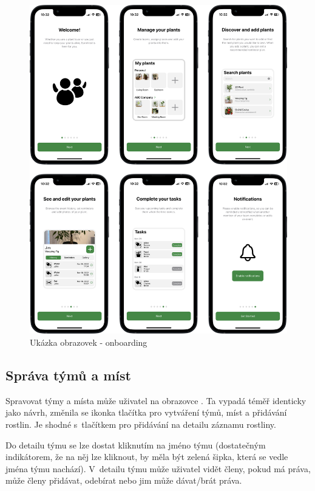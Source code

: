 \documentclass[thesis=M,czech]{FITthesis}[2019/12/23]
\begin{document}
\begin{figure}
	\centering
	\includegraphics[width=1\linewidth]{images/screenshots-1.png}
  	\caption{Ukázka obrazovek - onboarding}
  	\label{img:screenshots-1}
\end{figure}

\subsection{Správa týmů a míst}
Spravovat týmy a místa může uživatel na obrazovce . Ta vypadá téměř identicky jako návrh, změnila se ikonka tlačítka pro vytváření týmů, míst a přidávání rostlin. Je shodné s~tlačítkem pro přidávání na detailu záznamu rostliny.

Do detailu týmu se lze dostat kliknutím na jméno týmu (dostatečným indikátorem, že na něj lze kliknout, by měla být zelená šipka, která se vedle jména týmu nachází). V~detailu týmu může uživatel vidět členy, pokud má práva, může členy přidávat, odebírat nebo jim může dávat/brát práva.
\end{document}
